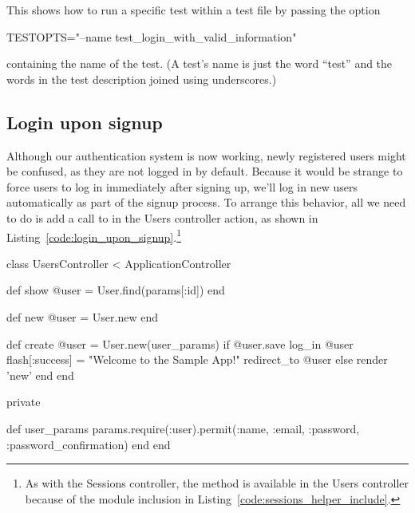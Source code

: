 \noindent This shows how to run a specific test within a test file by passing the option

\begin{code}
TESTOPTS="--name test_login_with_valid_information"
\end{code}

\noindent containing the name of the test. (A test's name is just the word ``test'' and the words in the test description joined using underscores.)


    \subsection{Login upon signup} %
    \label{sec:login_upon_signup}

Although our authentication system is now working, newly registered users might be confused, as they are not logged in by default. Because it would be strange to force users to log in immediately after signing up, we'll log in new users automatically as part of the signup process. To arrange this behavior, all we need to do is add a call to  in the Users controller  action, as shown in Listing~\ref{code:login_upon_signup}.\footnote{As with the Sessions controller, the  method is available in the Users controller because of the module inclusion in Listing~\ref{code:sessions_helper_include}.}

\begin{codelisting}
\label{code:login_upon_signup}
\begin{code}
class UsersController < ApplicationController

  def show
    @user = User.find(params[:id])
  end

  def new
    @user = User.new
  end

  def create
    @user = User.new(user_params)
    if @user.save
      log_in @user
      flash[:success] = "Welcome to the Sample App!"
      redirect_to @user
    else
      render 'new'
    end
  end

  private

    def user_params
      params.require(:user).permit(:name, :email, :password,
                                   :password_confirmation)
    end
end
\end{code}
\end{codelisting}


